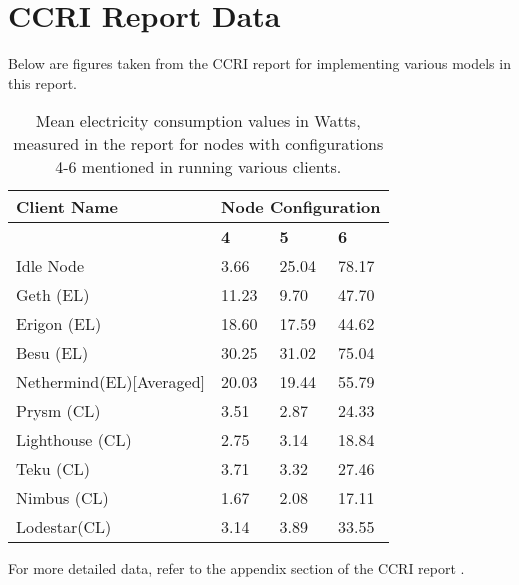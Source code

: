 
\section{CCRI Report Data}

Below are figures taken from the CCRI report \cite{CryptoCarbonRatingsInstitute2022TheNetwork} for implementing various models in this report.

\begin{table}[htb!]
\centering
\begin{tabular}{|l|lll|}
\hline
\textbf{Client Name} & \multicolumn{3}{l|}{\textbf{Node Configuration}}                               \\ \hline
\textbf{}            & \multicolumn{1}{l|}{\textbf{4}} & \multicolumn{1}{l|}{\textbf{5}} & \textbf{6} \\ \hline
Idle Node                & \multicolumn{1}{l|}{3.66}       & \multicolumn{1}{l|}{25.04}      & 78.17      \\ \cline{1-1}
Geth (EL)            & \multicolumn{1}{l|}{11.23}      & \multicolumn{1}{l|}{9.70}       & 47.70      \\ \cline{1-1}
Erigon (EL)          & \multicolumn{1}{l|}{18.60}      & \multicolumn{1}{l|}{17.59}      & 44.62      \\ \cline{1-1}
Besu (EL)            & \multicolumn{1}{l|}{30.25}      & \multicolumn{1}{l|}{31.02}      & 75.04      \\ \cline{1-1}
Nethermind(EL)[Averaged] & \multicolumn{1}{l|}{20.03}       & \multicolumn{1}{l|}{19.44}       & 55.79      \\ \cline{1-1}
Prysm (CL)           & \multicolumn{1}{l|}{3.51}       & \multicolumn{1}{l|}{2.87}       & 24.33      \\ \cline{1-1}
Lighthouse (CL)      & \multicolumn{1}{l|}{2.75}       & \multicolumn{1}{l|}{3.14}       & 18.84      \\ \cline{1-1}
Teku (CL)            & \multicolumn{1}{l|}{3.71}       & \multicolumn{1}{l|}{3.32}       & 27.46      \\ \cline{1-1}
Nimbus (CL)          & \multicolumn{1}{l|}{1.67}       & \multicolumn{1}{l|}{2.08}       & 17.11      \\ \cline{1-1}
Lodestar(CL)         & \multicolumn{1}{l|}{3.14}       & \multicolumn{1}{l|}{3.89}       & 33.55      \\ \hline

\end{tabular}
\caption{Mean electricity consumption values in Watts, measured in the report \cite{CryptoCarbonRatingsInstitute2022TheNetwork} for nodes with configurations 4-6 mentioned in   running various clients.  }
\label{Table:ConsumptionValues}
\end{table}

For more detailed data, refer to the appendix section of the CCRI report \cite{CryptoCarbonRatingsInstitute2022TheNetwork}.

